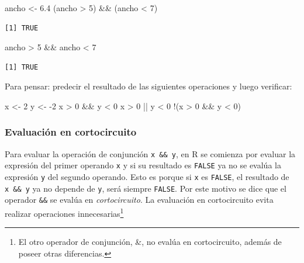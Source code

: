 \documentclass[
]{book}
\newenvironment{Shaded}{\begin{snugshade}}{\end{snugshade}}
\newcommand{\DecValTok}[1]{\textcolor[rgb]{0.00,0.00,0.81}{#1}}
\newcommand{\FloatTok}[1]{\textcolor[rgb]{0.00,0.00,0.81}{#1}}
\newcommand{\NormalTok}[1]{#1}
\newcommand{\OtherTok}[1]{\textcolor[rgb]{0.56,0.35,0.01}{#1}}
\newcommand{\SpecialCharTok}[1]{\textcolor[rgb]{0.00,0.00,0.00}{#1}}
\begin{document}
\begin{Shaded}
\begin{Highlighting}[]
\NormalTok{ancho }\OtherTok{\textless{}{-}} \FloatTok{6.4}
\NormalTok{(ancho }\SpecialCharTok{\textgreater{}} \DecValTok{5}\NormalTok{) }\SpecialCharTok{\&\&}\NormalTok{ (ancho }\SpecialCharTok{\textless{}} \DecValTok{7}\NormalTok{)}
\end{Highlighting}
\end{Shaded}

\begin{verbatim}
[1] TRUE
\end{verbatim}

\begin{Shaded}
\begin{Highlighting}[]
\NormalTok{ancho }\SpecialCharTok{\textgreater{}} \DecValTok{5} \SpecialCharTok{\&\&}\NormalTok{ ancho }\SpecialCharTok{\textless{}} \DecValTok{7}
\end{Highlighting}
\end{Shaded}

\begin{verbatim}
[1] TRUE
\end{verbatim}

Para pensar: predecir el resultado de las siguientes operaciones y luego verificar:

\begin{Shaded}
\begin{Highlighting}[]
\NormalTok{x }\OtherTok{\textless{}{-}} \DecValTok{2}
\NormalTok{y }\OtherTok{\textless{}{-}} \SpecialCharTok{{-}}\DecValTok{2}
\NormalTok{x }\SpecialCharTok{\textgreater{}} \DecValTok{0} \SpecialCharTok{\&\&}\NormalTok{ y }\SpecialCharTok{\textless{}} \DecValTok{0}
\NormalTok{x }\SpecialCharTok{\textgreater{}} \DecValTok{0} \SpecialCharTok{||}\NormalTok{ y }\SpecialCharTok{\textless{}} \DecValTok{0}
\SpecialCharTok{!}\NormalTok{(x }\SpecialCharTok{\textgreater{}} \DecValTok{0} \SpecialCharTok{\&\&}\NormalTok{ y }\SpecialCharTok{\textless{}} \DecValTok{0}\NormalTok{)}
\end{Highlighting}
\end{Shaded}

\hypertarget{evaluaciuxf3n-en-cortocircuito}{%
\subsubsection{Evaluación en cortocircuito}\label{evaluaciuxf3n-en-cortocircuito}}

Para evaluar la operación de conjunción \texttt{x\ \&\&\ y}, en R se comienza por evaluar la expresión del primer operando \texttt{x} y si su resultado es \texttt{FALSE} ya no se evalúa la expresión \texttt{y} del segundo operando. Esto es porque si \texttt{x} es \texttt{FALSE}, el resultado de \texttt{x\ \&\&\ y} ya no depende de \texttt{y}, será siempre \texttt{FALSE}. Por este motivo se dice que el operador \texttt{\&\&} se evalúa en \emph{cortocircuito}. La evaluación en cortocircuito evita realizar operaciones innecesarias\footnote{El otro operador de conjunción, \&, no evalúa en cortocircuito, además de poseer otras diferencias.}
\end{document}
